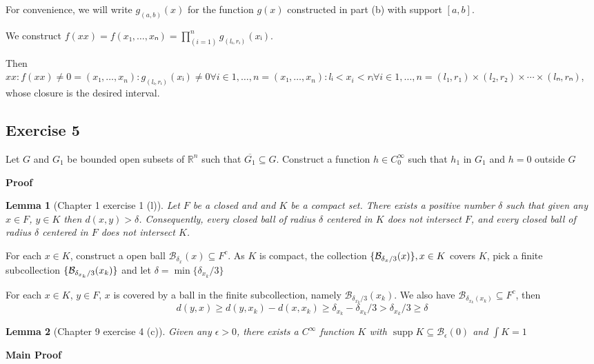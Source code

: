\documentclass{article}
\DeclareMathOperator{\supp}{supp}
\DeclarePairedDelimiter{\set}{\{}{\}}
\newtheorem{lemma}{Lemma}
\newcommand\Ball{\mathcal{B}}
\newcommand\R{\mathbb{R}}
\begin{document}
For convenience, we will write $g_(a, b)(x)$ for the function $g(x)$ constructed in part (b) with support $[a, b]$.

We construct $f(xx) = f(x₁, …, xₙ) = ∏_(i=1)^n g_(lᵢ, rᵢ)(xᵢ)$.

Then ${xx: f(xx) ≠ 0}
= {(x₁, …, x_n): g_(lᵢ, rᵢ)(xᵢ) ≠ 0 ∀i ∈{1, …, n}}
= {(x₁, …, x_n): lᵢ<x_i< rᵢ ∀i ∈{1, …, n}}
= (l₁, r₁)×(l₂, r₂) × ⋯ ×(lₙ, rₙ)$, whose closure is the desired interval.

\typstmathinputdisable{\$}
\subsection{Exercise 5} %
Let $G$ and $G_1$ be bounded open subsets of $\R^n$ such that $\overline{G_1} \subseteq G$. Construct a function $h \in C_0^\infty$ such that $h_1$ in $G_1$ and $h=0$ outside $G$

\textbf{Proof}

\begin{lemma}[Chapter 1 exercise 1 (l)]
    \label{lemma_9.5.1}
    Let $F$ be a closed and and $K$ be a compact set. There exists a positive number $\delta$ such that given any $x \in F$, $y \in K$ then $d(x, y) > \delta$. Consequently, every closed ball of radius $\delta$ centered in $K$ does not intersect $F$, and every closed ball of radius $\delta$ centered in $F$ does not intersect $K$.
\end{lemma}

For each $x \in K$, construct a open ball $\Ball_{\delta_x}(x) \subseteq F^c$. As $K$ is compact, the collection $\set{\Ball_{\delta_x / 3}(x)}, x \in K$ covers $K$, pick a finite subcollection $\set{\Ball_{\delta_{x_k} / 3}(x_k)}$ and let $\delta = \min \{ \delta_{x_k} / 3\}$

For each $x \in K$, $y \in F$, $x$ is covered by a ball in the finite subcollection, namely $\Ball_{\delta_{x_k} / 3}(x_k)$. We also have $\Ball_{\delta_{x_k}(x_k)} \subseteq F^c$, then
\[
    d(y, x) \geq d(y, x_k) - d(x, x_k) \geq \delta_{x_k} - \delta_{x_k} / 3 > \delta_{x_k} / 3 \geq \delta
\]

\begin{lemma}[Chapter 9 exercise 4 (c)]
    \label{lemma_9.5.2}
    Given any $\epsilon > 0$, there exists a $C^\infty$ function $K$ with $\supp K \subseteq \Ball_\epsilon(0)$ and $\int K = 1$
\end{lemma}

\textbf{Main Proof}
\end{document}
